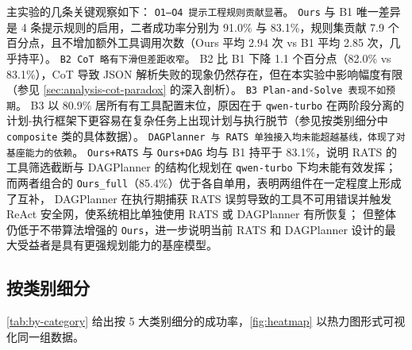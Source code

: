 主实验的几条关键观察如下：
\texttt{O1--O4 提示工程规则贡献显著}。
\texttt{Ours} 与 B1 唯一差异是 4 条提示规则的启用，二者成功率分别为 91.0\% 与 83.1\%，规则集贡献 7.9 个百分点，且不增加额外工具调用次数（Ours 平均 2.94 次 vs B1 平均 2.85 次，几乎持平）。
\texttt{B2 CoT 略有下滑但差距收窄}。
B2 比 B1 下降 1.1 个百分点（82.0\% vs 83.1\%），CoT 导致 JSON 解析失败的现象仍然存在，但在本实验中影响幅度有限（参见 \autoref{sec:analysis-cot-paradox} 的深入剖析）。
\texttt{B3 Plan-and-Solve 表现不如预期}。
B3 以 80.9\% 居所有有工具配置末位，原因在于 \texttt{qwen-turbo} 在两阶段分离的计划-执行框架下更容易在复杂任务上出现计划与执行脱节（参见按类别细分中 \texttt{composite} 类的具体数据）。
\texttt{DAGPlanner 与 RATS 单独接入均未能超越基线，体现了对基座能力的依赖}。
\texttt{Ours+RATS} 与 \texttt{Ours+DAG} 均与 B1 持平于 83.1\%，说明 RATS 的工具筛选截断与 DAGPlanner 的结构化规划在 \texttt{qwen-turbo} 下均未能有效发挥；
而两者组合的 \texttt{Ours\_full}（85.4\%）优于各自单用，表明两组件在一定程度上形成了互补，
DAGPlanner 在执行期捕获 RATS 误剪导致的工具不可用错误并触发 ReAct 安全网，使系统相比单独使用 RATS 或 DAGPlanner 有所恢复；
但整体仍低于不带算法增强的 \texttt{Ours}，进一步说明当前 RATS 和 DAGPlanner 设计的最大受益者是具有更强规划能力的基座模型。

\subsection{按类别细分}\label{sec:exp-category}

\autoref{tab:by-category} 给出按 5 大类别细分的成功率，\autoref{fig:heatmap} 以热力图形式可视化同一组数据。


